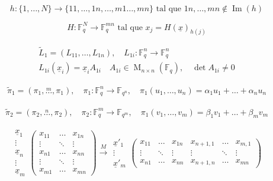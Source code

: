 \documentclass[12pt]{article}
\begin{document}
\[
h:\{1,\dots,N\}\longrightarrow
\{11,\dots,1n,\dots,m1\dots,mn\}
\text{ tal que }
1n,\dots,mn\notin\operatorname{Im}(h)
\]

\[
H:\mathbb{F}_q^N\longrightarrow
\mathbb{F}_q^{mn}
\text{ tal que }
x_j=H(\underline{x})_{h(j)}
\]

\begin{gather*}
\tilde{L}_1=(L_{11},\dots,L_{1n}),\quad L_{1i}:\mathbb{F}_q^{n}\to \mathbb{F}_q^{n}\\
L_{1i}(\underline{x}_i)=\underline{x}_i A_{1i}\quad
A_{1i}\in\operatorname{M}_{n\times n}(\mathbb{F}_q),\quad 
\det A_{1i}\neq 0
\end{gather*}

\begin{gather*}
\tilde{\pi}_1=(\pi_1,\overset{m}{\dots},\pi_1),\quad \pi_1:\mathbb{F}_q^{n}\to\mathbb{F}_{q^{n}},\quad
\pi_1(u_1,\dots,u_n)=\alpha_1 u_1+\dots+\alpha_n u_n
\end{gather*}

\begin{gather*}
\tilde{\pi}_2=(\pi_2,\overset{n}{\dots},\pi_2),\quad \pi_2:\mathbb{F}_q^{m}\to\mathbb{F}_{q^{m}},\quad
\pi_1(v_1,\dots,v_m)=\beta_1 v_1+\dots+\beta_m v_m
\end{gather*}

\[
\begin{matrix}
\underline{x}_1\\
\vdots\\
\underline{x}_n\\
\vdots\\
\underline{x}_m
\end{matrix}
\begin{pmatrix}
x_{11}&\dots&x_{1n}\\
\vdots&\ddots&\vdots\\
x_{n1}&\dots&x_{nn}\\
\vdots&\ddots&\vdots\\
x_{m1}&\dots&x_{mn}
\end{pmatrix}
\overset{M}{\longrightarrow}
\begin{matrix}
\underline{x}'_1\\
\vdots\\
\underline{x}'_m
\end{matrix}
\begin{pmatrix}
x_{11}&\dots&x_{1n}&x_{n+1,1}&\dots&x_{m,1}\\
\vdots&\ddots&\vdots&\vdots&\ddots&\vdots\\
x_{n1}&\dots&x_{nn}&x_{n+1,n}&\dots&x_{mn}
\end{pmatrix}
\]
\end{document}
